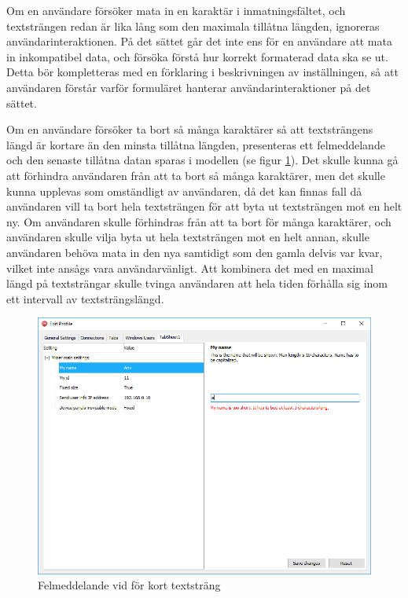 Om en användare försöker mata in en karaktär i inmatningsfältet, och textsträngen redan är lika lång som den maximala tillåtna längden, ignoreras användarinteraktionen. På det sättet går det inte ens för en användare att mata in inkompatibel data, och försöka förstå hur korrekt formaterad data ska se ut. Detta bör kompletteras med en förklaring i beskrivningen av inställningen, så att användaren förstår varför formuläret hanterar användarinteraktioner på det sättet.

Om en användare försöker ta bort så många karaktärer så att textsträngens längd är kortare än den minsta tillåtna längden, presenteras ett felmeddelande och den senaste tillåtna datan sparas i modellen (se figur \ref{fig:textstrang-minLength}). Det skulle kunna gå att förhindra användaren från att ta bort så många karaktärer, men det skulle kunna upplevas som omständligt av användaren, då det kan finnas fall då användaren vill ta bort hela textsträngen för att byta ut textsträngen mot en helt ny. Om användaren skulle förhindras från att ta bort för många karaktärer, och användaren skulle vilja byta ut hela textsträngen mot en helt annan, skulle användaren behöva mata in den nya samtidigt som den gamla delvis var kvar, vilket inte ansågs vara användarvänligt. Att kombinera det med en maximal längd på textsträngar skulle tvinga användaren att hela tiden förhålla sig inom ett intervall av textsträngslängd.

\begin{figure}
	\includegraphics[width=\textwidth]{./images/gui/textstrang-minLength.png}
	\vspace{-1.7em}
	\caption{Felmeddelande vid för kort textsträng}
	\label{fig:textstrang-minLength}
\end{figure}

